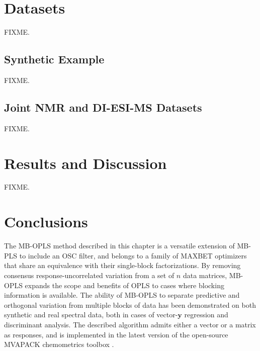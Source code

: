 \section{Datasets}

\begin{doublespace}
FIXME.
\end{doublespace}

\subsection{Synthetic Example}

\begin{doublespace}
FIXME.
\end{doublespace}

\subsection{Joint \hnmr{} NMR and DI-ESI-MS Datasets}

\begin{doublespace}
FIXME.
\end{doublespace}

\section{Results and Discussion}

\begin{doublespace}
FIXME.
\end{doublespace}

\section{Conclusions}

\begin{doublespace}
The MB-OPLS method described in this chapter is a versatile extension of
MB-PLS to include an OSC filter, and belongs to a family of MAXBET optimizers
that share an equivalence with their single-block factorizations. By removing
consensus response-uncorrelated variation from a set of $n$ data matrices,
MB-OPLS expands the scope and benefits of OPLS to cases where blocking
information is available. The ability of MB-OPLS to separate predictive and
orthogonal variation from multiple blocks of data has been demonstrated on
both synthetic and real spectral data, both in cases of vector-$\mathbf{y}$
regression and discriminant analysis. The described algorithm admits either
a vector or a matrix as responses, and is implemented in the latest version
of the open-source MVAPACK chemometrics toolbox \cite{worley:acscb2014}.
\end{doublespace}





